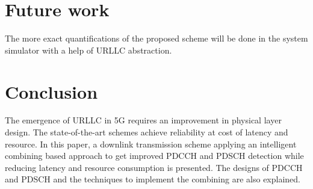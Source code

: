 \documentclass[conference,10pt]{IEEEtran}
\begin{document}
\section{Future work}
The more exact quantifications of the proposed scheme will be done in the system simulator with a help of URLLC abstraction.

\section{Conclusion}

The emergence of URLLC in 5G requires an improvement in physical layer design. The state-of-the-art schemes achieve reliability at cost of latency and resource. In this paper, a downlink transmission scheme applying an intelligent combining based approach to get improved PDCCH and PDSCH detection while reducing latency and resource consumption is presented. The designs of PDCCH and PDSCH and the techniques to implement the combining are also explained. 
\end{document}
